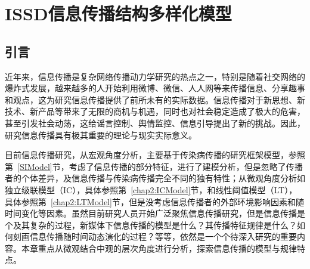 

\chapter{ISSD信息传播结构多样化模型}
\label{cha:5thChap05}

\section{引言}
近年来，信息传播是复杂网络传播动力学研究的热点之一，特别是随着社交网络的爆炸式发展，越来越多的人开始利用微博、微信、人人网等来传播信息、分享趣事和观点，这为研究信息传播提供了前所未有的实际数据。信息传播对于新思想、新技术、新产品等带来了无限的商机与机遇，同时也对社会稳定造成了极大的危害，甚至引发社会动荡，这给谣言控制、舆情监控、信息引导提出了新的挑战。因此，研究信息传播具有极其重要的理论与现实实际意义。

目前信息传播研究，从宏观角度分析，主要基于传染病传播的研究框架模型，参照第~\ref{SIModel}节，考虑了信息传播的部分特征，进行了建模分析，但是忽略了传播者的个体差异，及信息传播与传染病传播完全不同的独有特性；从微观角度分析如独立级联模型（IC），具体参照第~\ref{chap2:ICModel}节，和线性阈值模型（LT），具体参照第~\ref{chap2:LTModel}节，但是没考虑信息传播者的外部环境影响因素和随时间变化等因素。虽然目前研究人员开始广泛聚焦信息传播研究，但是信息传播是个及其复杂的过程，新媒体下信息传播的模型是什么？其传播特征规律是什么？如何刻画信息传播随时间动态演化的过程？等等，依然是一个个待深入研究的重要内容。本章重点从微观结合中观的层次角度进行分析，探索信息传播的模型与规律特点。


